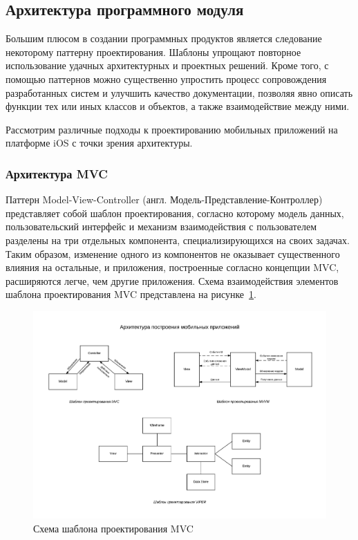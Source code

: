 
\subsection{Архитектура программного модуля}

Большим плюсом в создании программных продуктов является следование некоторому
паттерну проектирования. Шаблоны упрощают повторное использование удачных
архитектурных и проектных решений.
Кроме того, с помощью паттернов можно существенно
упростить процесс сопровождения разработанных систем и улучшить
качество документации, позволяя явно описать функции тех или иных
классов и объектов, а также взаимодействие между ними.

Рассмотрим различные подходы к проектированию мобильных приложений на платформе
iOS с точки зрения архитектуры.



\subsubsection{Архитектура MVC}

Паттерн Model-View-Controller (англ. Модель-Представление-Контроллер) представляет
собой шаблон проектирования, согласно которому модель данных,
пользовательский интерфейс и механизм взаимодействия с пользователем разделены
на три отдельных компонента, специализирующихся на своих задачах.
Таким образом, изменение одного из компонентов не оказывает существенного
влияния на остальные, и приложения, построенные согласно концепции MVC,
расширяются легче, чем другие приложения.
Схема взаимодействия элементов шаблона проектирования MVC
представлена на рисунке~\ref{fig:mvc}.
\begin{figure}[h!]
  \centering
  \includegraphics[width=140mm]{fig/mvc}
  \caption{Схема шаблона проектирования MVC}
  \label{fig:mvc}
\end{figure}

